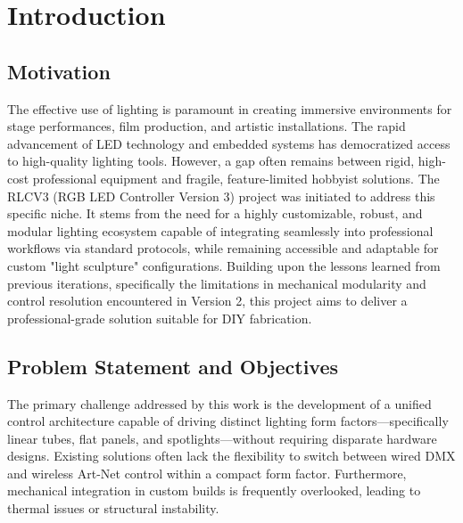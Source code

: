 \section{Introduction}
\label{sec:introduction}

\subsection{Motivation}
The effective use of lighting is paramount in creating immersive environments for stage performances, film production, and artistic installations.
The rapid advancement of \ac{LED} technology and embedded systems has democratized access to high-quality lighting tools.
However, a gap often remains between rigid, high-cost professional equipment and fragile, feature-limited hobbyist solutions.
The RLCV3 (\ac{RGB} \ac{LED} Controller Version 3) project was initiated to address this specific niche.
It stems from the need for a highly customizable, robust, and modular lighting ecosystem capable of integrating seamlessly into professional workflows via standard protocols, while remaining accessible and adaptable for custom "light sculpture" configurations.
Building upon the lessons learned from previous iterations, specifically the limitations in mechanical modularity and control resolution encountered in Version 2, this project aims to deliver a professional-grade solution suitable for \ac{DIY} fabrication.

\subsection{Problem Statement and Objectives}
The primary challenge addressed by this work is the development of a unified control architecture capable of driving distinct lighting form factors—specifically linear tubes, flat panels, and spotlights—without requiring disparate hardware designs.
Existing solutions often lack the flexibility to switch between wired \ac{DMX} and wireless Art-Net control within a compact form factor.
Furthermore, mechanical integration in custom builds is frequently overlooked, leading to thermal issues or structural instability.

